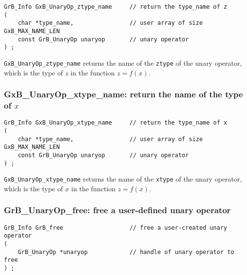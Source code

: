 \documentclass[12pt]{article}
\begin{document}
\begin{mdframed}[userdefinedwidth=6in]
{\footnotesize
\begin{verbatim}
GrB_Info GxB_UnaryOp_ztype_name     // return the type_name of z
(
    char *type_name,                // user array of size GxB_MAX_NAME_LEN
    const GrB_UnaryOp unaryop       // unary operator
) ;
\end{verbatim}
}\end{mdframed}

\verb'GxB_UnaryOp_ztype_name' returns the name of the \verb'ztype' of the unary
operator, which is the type of $z$ in the function $z=f(x)$.

\subsubsection{{\sf GxB\_UnaryOp\_xtype\_name:} return the name of the type of $x$}
\label{unaryop_xtype_name}

\begin{mdframed}[userdefinedwidth=6in]
{\footnotesize
\begin{verbatim}
GrB_Info GxB_UnaryOp_xtype_name     // return the type_name of x
(
    char *type_name,                // user array of size GxB_MAX_NAME_LEN
    const GrB_UnaryOp unaryop       // unary operator
) ;
\end{verbatim}
}\end{mdframed}

\verb'GxB_UnaryOp_xtype_name' returns the name of the \verb'xtype' of the unary
operator, which is the type of $x$ in the function $z=f(x)$.

\newpage
\subsubsection{{\sf GrB\_UnaryOp\_free:} free a user-defined unary operator}
\label{unaryop_free}

\begin{mdframed}[userdefinedwidth=6in]
{\footnotesize
\begin{verbatim}
GrB_Info GrB_free                   // free a user-created unary operator
(
    GrB_UnaryOp *unaryop            // handle of unary operator to free
) ;
\end{verbatim}
}\end{mdframed}
\end{document}
